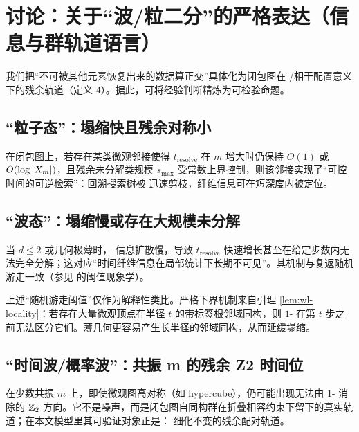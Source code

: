 
\section{讨论：关于“波/粒二分”的严格表达（信息与群轨道语言）}

我们把“不可被其他元素恢复出来的数据算正交”具体化为闭包图在 \WL{}/相干配置意义下的残余轨道（定义 4）。据此，可将经验判断精炼为可检验命题。

\subsection{“粒子态”：塌缩快且残余对称小}

在闭包图上，若存在某类微观邻接使得 $t_{\mathrm{resolve}}$ 在 $m$ 增大时仍保持 $O(1)$ 或 $O(\log\left\lvert X_m\right\rvert)$，且残余未分解类规模 $s_{\max}$ 受常数上界控制，则该邻接实现了“可控时间的可逆检索”：回溯搜索树被 \WL{} 迅速剪枝，纤维信息可在短深度内被定位。

\subsection{“波态”：塌缩慢或存在大规模未分解}

当 $d\le 2$ 或几何极薄时，\WL{} 信息扩散慢，导致 $t_{\mathrm{resolve}}$ 快速增长甚至在给定步数内无法完全分解；这对应“时间纤维信息在局部统计下长期不可见”。其机制与复返随机游走一致（参见 \cite{novakpolya} 的阈值现象学）。
\begin{remark}
上述“随机游走阈值”仅作为解释性类比。严格下界机制来自引理 \ref{lem:wl-locality}：若存在大量微观顶点在半径 $t$ 的带标签根邻域同构，则 $1$-\WL{} 在第 $t$ 步之前无法区分它们。薄几何更容易产生长半径的邻域同构，从而延缓塌缩。
\end{remark}

\subsection{“时间波/概率波”：共振 m 的残余 Z2 时间位}

在少数共振 $m$ 上，即使微观图高对称（如 hypercube），仍可能出现无法由 $1$-\WL{} 消除的 $\mathbb{Z}_2$ 方向。它不是噪声，而是闭包图自同构群在折叠相容约束下留下的真实轨道；在本文模型里其可验证对象正是：\WL{} 细化不变的残余配对轨道。

